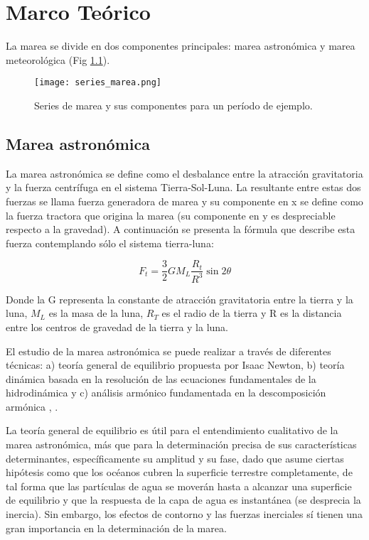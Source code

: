 \chapter{Marco Teórico}

La marea se divide en dos componentes principales: marea astronómica y marea meteorológica (Fig \ref{fig:mareas}). 

\begin{figure}
	\centering
	\texttt{[image: series\_marea.png]}
	\caption{Series de marea y sus componentes para un período de ejemplo.}
	\label{fig:mareas}
\end{figure}


\section{Marea astronómica}

La marea astronómica se define como el desbalance entre la atracción gravitatoria y la fuerza
centrífuga en el sistema Tierra-Sol-Luna. La resultante entre estas dos fuerzas se llama fuerza generadora de marea y su componente en x se define como la fuerza tractora que origina la marea (su componente en y es despreciable respecto a la gravedad). A continuación se presenta la fórmula que describe esta fuerza contemplando sólo el sistema tierra-luna:

\begin{equation}F_{t}=\frac{3}{2} G M_{L} \frac{R_{t}}{R^{3}} \sin 2 \theta\end{equation}

Donde la G representa la constante de atracción gravitatoria entre la tierra y la luna, $M_{L}$ es la masa de la luna, $R_{T}$ es el radio de la tierra y R es la distancia entre los centros de gravedad de la tierra y la luna.

El estudio de la marea astronómica se puede realizar a través de diferentes técnicas: a) teoría general de equilibrio propuesta por Isaac Newton, b) teoría dinámica basada en la resolución de las ecuaciones fundamentales de la hidrodinámica \citep{Jesus2005} y c) análisis armónico fundamentada en la descomposición armónica \citep{Dronkers1975}, \citep{Schuremann1958}.

La teoría general de equilibrio es útil para el entendimiento cualitativo de la marea astronómica, más que para la determinación precisa de sus características determinantes, específicamente su amplitud y su fase, dado que asume ciertas hipótesis como que los océanos cubren la superficie terrestre completamente, de tal forma
que las partículas de agua se moverán hasta a alcanzar una superficie de
equilibrio y que la respuesta de la capa de agua es instantánea (se desprecia la inercia). Sin embargo, los efectos de contorno y las fuerzas inerciales sí tienen una gran importancia en la determinación de la marea.

